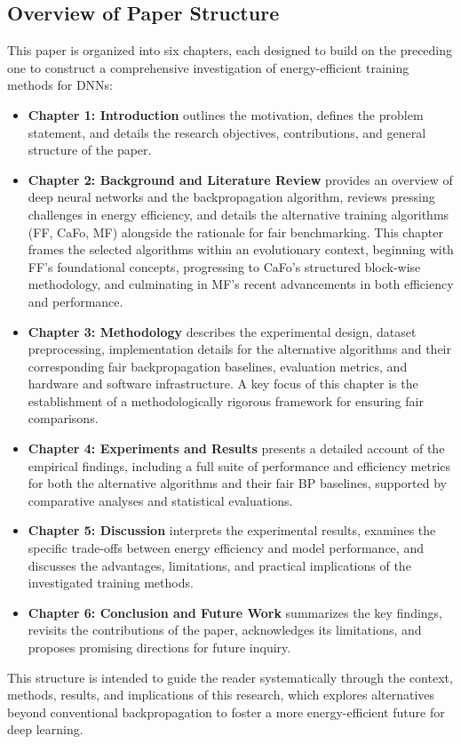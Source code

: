 \subsection{Overview of Paper Structure}
\label{sec:structure}

This paper is organized into six chapters, each designed to build on the preceding one to construct a comprehensive investigation of energy-efficient training methods for DNNs:
\begin{itemize}
    \item \textbf{Chapter 1: Introduction} outlines the motivation, defines the problem statement, and details the research objectives, contributions, and general structure of the paper.

    \item \textbf{Chapter 2: Background and Literature Review} provides an overview of deep neural networks and the backpropagation algorithm, reviews pressing challenges in energy efficiency, and details the alternative training algorithms (FF, CaFo, MF) alongside the rationale for fair benchmarking. This chapter frames the selected algorithms within an evolutionary context, beginning with FF's foundational concepts, progressing to CaFo's structured block-wise methodology, and culminating in MF's recent advancements in both efficiency and performance.

    \item \textbf{Chapter 3: Methodology} describes the experimental design, dataset preprocessing, implementation details for the alternative algorithms and their corresponding fair backpropagation baselines, evaluation metrics, and hardware and software infrastructure. A key focus of this chapter is the establishment of a methodologically rigorous framework for ensuring fair comparisons.

    \item \textbf{Chapter 4: Experiments and Results} presents a detailed account of the empirical findings, including a full suite of performance and efficiency metrics for both the alternative algorithms and their fair BP baselines, supported by comparative analyses and statistical evaluations.

    \item \textbf{Chapter 5: Discussion} interprets the experimental results, examines the specific trade-offs between energy efficiency and model performance, and discusses the advantages, limitations, and practical implications of the investigated training methods.

    \item \textbf{Chapter 6: Conclusion and Future Work} summarizes the key findings, revisits the contributions of the paper, acknowledges its limitations, and proposes promising directions for future inquiry.
\end{itemize}
This structure is intended to guide the reader systematically through the context, methods, results, and implications of this research, which explores alternatives beyond conventional backpropagation to foster a more energy-efficient future for deep learning.